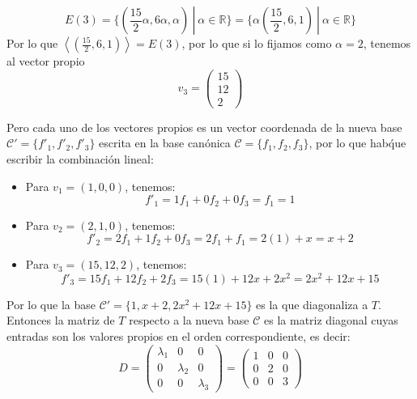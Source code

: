 \begin{itemize}
\begin{itemize}
\[E(3)=\{(\frac{15}{2}\alpha,6\alpha,\alpha)~|~\alpha\in \mathbb{R}\}=\{\alpha\left(\frac{15}{2},6,1\right)~|~\alpha\in \mathbb{R}\}\]
Por lo que $\left\langle\left(\frac{15}{2},6,1\right)\right\rangle=E(3)$, por lo que si lo fijamos como $\alpha=2$, tenemos al vector propio
\[v_3=\begin{pmatrix}15\\12\\2\end{pmatrix}\]
\end{itemize}
Pero cada uno de los vectores propios es un vector coordenada de la nueva base $\mathcal{C}'=\{f'_1,f'_2,f'_3\}$ escrita en la base can\'onica $\mathcal{C}=\{f_1,f_2,f_3\}$, por lo que hab\' que escribir la combinaci\'on lineal:
\begin{itemize}
    \item Para $v_1=(1,0,0)$, tenemos:
    \[f'_1=1f_1+0f_2+0f_3=f_1=1\]
    \item Para $v_2=(2,1,0)$, tenemos:
    \[f'_2=2f_1+1f_2+0f_3=2f_1+f_1=2(1)+x=x+2\]
    \item Para $v_3=(15,12,2)$, tenemos:
    \[f'_3=15f_1+12f_2+2f_3=15(1)+12x+2x^2=2x^2+12x+15\]
\end{itemize}
Por lo que la base $\mathcal{C}'=\{1,x+2,2x^2+12x+15\}$ es la que diagonaliza a $T$.\\
Entonces la matriz de $T$ respecto a la nueva base $\mathcal{C}$ es la matriz diagonal cuyas entradas son los valores propios en el orden correspondiente, es decir:
\[D=\begin{pmatrix}\lambda_1&0&0\\0&\lambda_2&0\\0&0&\lambda_3\end{pmatrix}=\begin{pmatrix}1&0&0\\0&2&0\\0&0&3\end{pmatrix}\]



\end{itemize}
